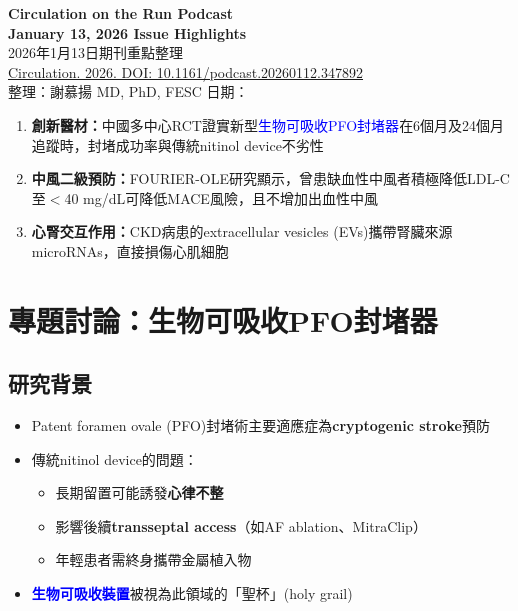 \documentclass[12pt,a4paper]{article}
\begin{document}
\begin{center}
{\LARGE\bfseries\textcolor{emergency_red}{Circulation on the Run Podcast}}\\[0.5cm]
{\Large\textbf{January 13, 2026 Issue Highlights}}\\[0.3cm]
{\large 2026年1月13日期刊重點整理}\\[0.5cm]
{\normalsize \href{https://doi.org/10.1161/podcast.20260112.347892}{Circulation. 2026. DOI: 10.1161/podcast.20260112.347892}}\\[0.3cm]
{\normalsize 整理：謝慕揚 MD, PhD, FESC \quad 日期：\mydate}
\end{center}

\vspace{0.5cm}

\begin{tcolorbox}[colback=yellow!10!white,colframe=orange!75!black,title=\textbf{本期核心重點}]
\begin{enumerate}
    \item \textbf{創新醫材：}中國多中心RCT證實新型\textcolor{blue}{生物可吸收PFO封堵器}在6個月及24個月追蹤時，封堵成功率與傳統nitinol device不劣性
    \item \textbf{中風二級預防：}FOURIER-OLE研究顯示，曾患缺血性中風者積極降低LDL-C至$<$40 mg/dL可降低MACE風險，且不增加出血性中風
    \item \textbf{心腎交互作用：}CKD病患的extracellular vesicles (EVs)攜帶腎臟來源microRNAs，直接損傷心肌細胞
\end{enumerate}
\end{tcolorbox}

\tableofcontents
\newpage

\section{專題討論：生物可吸收PFO封堵器}

\subsection{研究背景}

\begin{itemize}
    \item Patent foramen ovale (PFO)封堵術主要適應症為\textbf{cryptogenic stroke}預防
    \item 傳統nitinol device的問題：
    \begin{itemize}
        \item 長期留置可能誘發\textbf{心律不整}
        \item 影響後續\textbf{transseptal access}（如AF ablation、MitraClip）
        \item 年輕患者需終身攜帶金屬植入物
    \end{itemize}
    \item \textcolor{blue}{\textbf{生物可吸收裝置}}被視為此領域的「聖杯」(holy grail)
\end{itemize}
\end{document}
